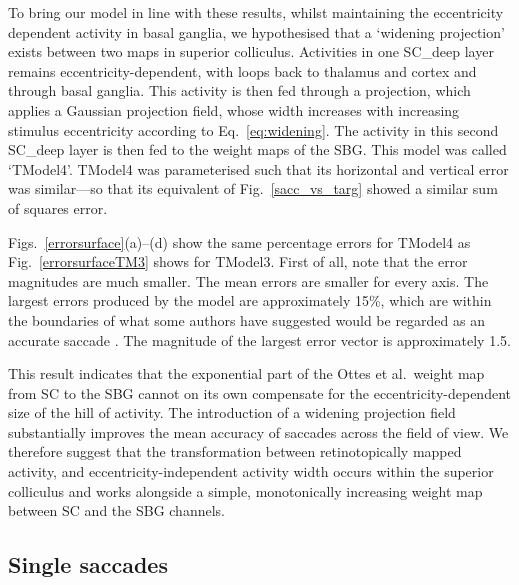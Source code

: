 \documentclass{frontiersSCNS}
\begin{document}
To bring our model in line with these results, whilst maintaining the
eccentricity dependent activity in basal ganglia, we hypothesised that
a `widening projection' exists between two maps in superior
colliculus. Activities in one SC\_deep layer remains
eccentricity-dependent, with loops back to thalamus and cortex and
through basal ganglia.  This activity is then fed through a
projection, which applies a Gaussian projection field, whose width
increases with increasing stimulus eccentricity according to
Eq.~\ref{eq:widening}.  The activity in this second SC\_deep layer is
then fed to the weight maps of the SBG. This model was called
`TModel4'. TModel4 was parameterised such that its horizontal and
vertical error was similar---so that its equivalent of
Fig.~\ref{sacc_vs_targ} showed a similar sum of squares error.

Figs.~\ref{errorsurface}(a)--(d) show the same percentage errors for
TModel4 as Fig.~\ref{errorsurfaceTM3} shows for TModel3.  First of
all, note that the error magnitudes are much smaller. The mean errors
are smaller for every axis. The largest errors produced by the model
are approximately 15\%, which are within the boundaries of what some
authors have suggested would be regarded as an accurate
saccade \citep{mcpeek_saccade_2002,mcpeek_incomplete_2006}.  The
magnitude of the largest error vector is approximately 1.5\dg.

This result indicates that the exponential part of the Ottes et
al.~weight map from SC to the SBG cannot on its own compensate for the
eccentricity-dependent size of the hill of activity. The introduction
of a widening projection field substantially improves the mean
accuracy of saccades across the field of view.  We therefore suggest
that the transformation between retinotopically mapped activity, and
eccentricity-independent activity width occurs within the superior
colliculus and works alongside a simple, monotonically increasing
weight map between SC and the SBG channels.

\subsection{Single saccades} \label{sec:singlesaccades}
\end{document}
